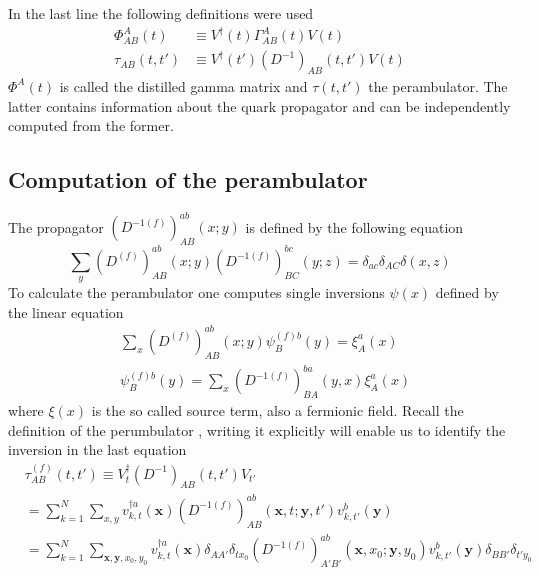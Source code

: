     In the last line the following definitions were used
    \begin{equation}
        \begin{aligned}\label{def_gamma_and_perambulator}
            \Phi_{AB}^A(t) &\equiv V^\dagger(t)\Gamma_{AB}^A(t)V(t)\\
            \tau_{AB}(t,t') &\equiv V^\dagger(t')(D^{-1})_{AB}(t,t')V(t)
        \end{aligned}
    \end{equation}
    $\Phi^A(t)$ is called the distilled gamma matrix and $\tau(t,t')$ the perambulator. The latter contains information about the quark propagator and can be independently computed from the former.
    
\subsection{Computation of the perambulator}
    The propagator $(D^{-1(f)})^{ab}_{AB}(x;y)$ is defined by the following equation \cite{four_quark_correlation_functions}
    \begin{equation}
        \sum_{y}(D^{(f)})^{ab}_{AB}(x;y)(D^{-1(f)})^{bc}_{BC}(y;z) = \delta_{ac}\delta_{AC}\delta(x,z)
    \end{equation}
    To calculate the perambulator one computes single inversions $\psi(x)$ defined by the linear equation
    \begin{equation}
        \begin{aligned}\label{inversion_term}
            &\sum_{x}(D^{(f)})^{ab}_{AB}(x;y)\psi^{(f)b}_{B}(y) = \xi^a_A(x)\\
            &\psi^{(f)b}_{B}(y) = \sum_{x}(D^{-1(f)})^{ba}_{BA}(y,x)\xi^a_A(x)
        \end{aligned}
    \end{equation}
    where $\xi(x)$ is the so called source term, also a fermionic field. Recall the definition of the perumbulator , writing it explicitly will enable us to identify the inversion in the last equation \cite{bachelor_thesis_jan}
    \begin{equation}\label{perambulator_explicit}
        \begin{aligned}
            &\tau^{(f)}_{AB}(t,t') \equiv V^\dagger_t(D^{-1})_{AB}(t,t')V_{t'}\\
            &= \sum_{k=1}^N \sum_{x,y}
            v_{k,t}^{\dagger a}(\textbf{x}) 
            (D^{-1(f)})^{ab}_{AB}(\textbf{x},t;\textbf{y},t')
            v_{k,t'}^{b}(\textbf{y})\\
            &= \sum_{k=1}^N \sum_{\textbf{x},\textbf{y},x_0,y_0}
            v_{k,t}^{\dagger a}(\textbf{x})\delta_{AA'}\delta_{tx_0}
            (D^{-1(f)})^{ab}_{A'B'}(\textbf{x},x_0;\textbf{y},y_0)
            v_{k,t'}^{b}(\textbf{y})\delta_{BB'}\delta_{t'y_0}
        \end{aligned}
    \end{equation}
